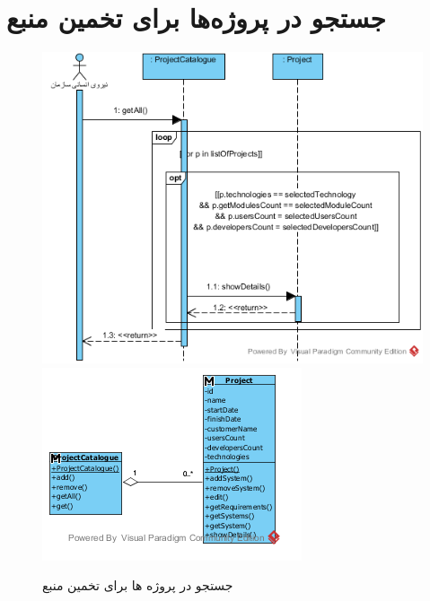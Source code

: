 \section{جستجو در پروژه‌ها برای تخمین منبع}
\begin{figure}[H]
	\centering
	\includegraphics[scale=0.7]{img/sequence-analysis/SearchInProjects}
	\includegraphics[scale=0.7]{img/sequence-analysis/SearchInProjectsC}
	\caption{جستجو در پروژه ها برای تخمین منبع}
\end{figure}

